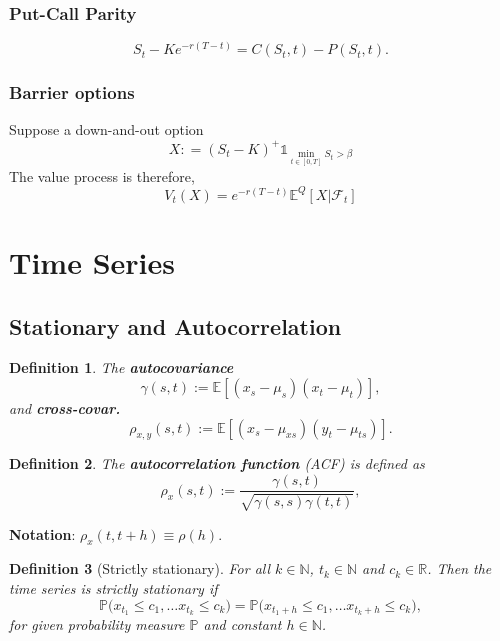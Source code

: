 \documentclass[10pt]{article}
\theoremstyle{remark}
\theoremstyle{plain}
\newtheorem{Definition}{Definition}[section]
\newcommand{\R}{\mathbb{R}}
\newcommand{\E}{\mathbb{E}}
\newcommand{\N}{\mathbb{N}}
\numberwithin{equation}{section}
\renewcommand{\leq}{\leqslant}
\begin{document}
\subsubsection{Put-Call Parity}
\begin{equation}
	S_t - Ke^{-r(T-t)} = C(S_t, t) - P(S_t,t).
\end{equation}


\subsubsection{Barrier options}
Suppose a down-and-out option
\[
X : = (S_t - K)^+ \mathds{1}_{\min_{t\in[0,T]}S_t > \beta }
\]
The value process is therefore,
\[
 V_t(X) = e^{-r(T-t)} \E^Q [X|\mathcal{F}_t]
\]

%
%
\clearpage
\section{Time Series}


\subsection{Stationary and Autocorrelation}

\begin{Definition}
	The \textbf{autocovariance} $$\gamma (s,t) := \mathds{E} \left[(x_s - \mu_s) (x_t-\mu_t)\right],$$ and \textbf{cross-covar.} $$\rho_{x,y}(s,t):= \mathds{E}\left[(x_s - \mu_{xs})(y_t - \mu_{ts})\right].$$
\end{Definition}

\begin{Definition}
	The \textbf{autocorrelation function} (ACF) is defined as
	\[
	\rho_{x} (s,t)  := \frac{\gamma(s,t)}{\sqrt{\gamma(s,s)\gamma(t,t)}},
	\]
\end{Definition}

\textbf{Notation}: $\rho_{x}(t, t+h)  \equiv \rho(h)$.

\begin{Definition}[Strictly stationary]
	For all $k \in \N$, $t_k \in \N$ and $c_k \in \R$. Then the time series is strictly stationary if
	\[
	\mathds{P} \big(x_{t_1} \leq c_1, \dots x_{t_k} \leq c_k \big) = \mathds{P} \big(x_{t_1+h} \leq c_1, \dots x_{t_k+h} \leq c_k \big),
	\]
	for given probability measure $\mathds{P}$ and constant $h \in \N$.
\end{Definition}
\end{document}
